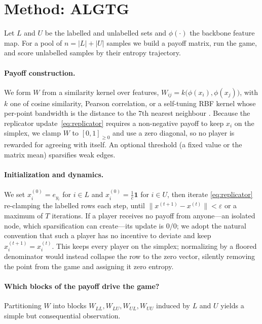 \documentclass[11pt]{article}
\begin{document}
\section{Method: ALGTG}

Let $L$ and $U$ be the labelled and unlabelled sets and $\phi(\cdot)$ the backbone
feature map. For a pool of $n=|L|+|U|$ samples we build a payoff matrix, run the
game, and score unlabelled samples by their entropy trajectory.

\paragraph{Payoff construction.} We form $W$ from a similarity kernel over features,
$W_{ij}=k\big(\phi(x_i),\phi(x_j)\big)$, with $k$ one of cosine similarity,
Pearson correlation, or a self-tuning RBF kernel whose per-point bandwidth is the
distance to the $7$th nearest neighbour \citep{zelnikmanor2004self}. Because the
replicator update~\eqref{eq:replicator} requires a non-negative payoff to keep
$x_i$ on the simplex, we clamp $W$ to $[0,1]_{\ge 0}$ and use a zero diagonal, so no
player is rewarded for agreeing with itself. An optional threshold (a fixed value or
the matrix mean) sparsifies weak edges.

\paragraph{Initialization and dynamics.} We set $x_i^{(0)}=e_{y_i}$ for $i\in L$
and $x_i^{(0)}=\tfrac{1}{c}\mathbf{1}$ for $i\in U$, then iterate
\eqref{eq:replicator} re-clamping the labelled rows each step, until
$\lVert x^{(t+1)}-x^{(t)}\rVert < \varepsilon$ or a maximum of $T$ iterations. If a
player receives no payoff from anyone---an isolated node, which sparsification can
create---its update is $0/0$; we adopt the natural convention that such a player has
no incentive to deviate and keep $x_i^{(t+1)}=x_i^{(t)}$. This keeps every player on
the simplex; normalizing by a floored denominator would instead collapse the row to
the zero vector, silently removing the point from the game and assigning it zero
entropy.

\paragraph{Which blocks of the payoff drive the game?} Partitioning $W$ into blocks
$W_{LL},W_{LU},W_{UL},W_{UU}$ induced by $L$ and $U$ yields a simple but consequential
observation.
\end{document}
